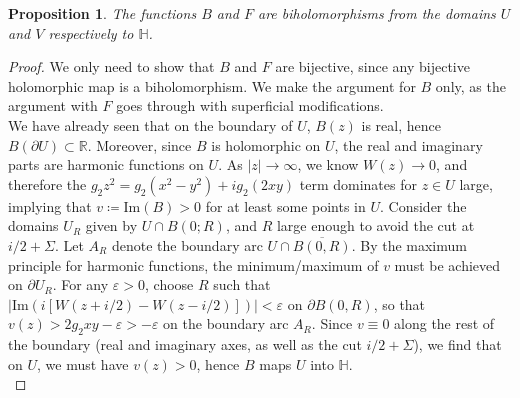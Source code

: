 \documentclass[10pt]{article}
\newcommand{\rr}{\mathbb{R}}
\newcommand{\hh}{\mathbb{H}}
\newcommand{\im}[1]{\text{Im}(#1)}
\theoremstyle{plain}
\newtheorem{prop}[theorem]{Proposition}
\theoremstyle{definition}
\theoremstyle{plain}
\begin{document}
\begin{prop}
	The functions $B$ and $F$ are biholomorphisms from the domains $U$ and $V$ respectively to $\hh$. 
\end{prop}

\begin{proof}
	We only need to show that $B$ and $F$ are bijective, since any bijective holomorphic map is a biholomorphism. We make the argument for $B$ only, as the argument with $F$ goes through with superficial modifications. \\
	
	We have already seen that on the boundary of $U$, $B(z)$ is real, hence $B(\partial U)\subset \rr$. Moreover, since $B$ is holomorphic on $U$, the real and imaginary parts are harmonic functions on $U$. As $|z|\to\infty$, we know $W(z)\to 0$, and therefore the $g_2z^2=g_2(x^2-y^2)+ig_2(2xy)$ term dominates for $z\in U$ large, implying that $v\coloneqq\im{B}>0$ for at least some points in $U$. Consider the domains $U_R$ given by $U\cap B(0;R)$, and $R$ large enough to avoid the cut at $i/2+\Sigma$. Let $A_R$ denote the boundary arc $U\cap\overline{B(0,R)}$. By the maximum principle for harmonic functions, the minimum/maximum of $v$ must be achieved on $\partial U_R$. For any $\varepsilon>0$, choose $R$ such that $|\text{Im}( i[W(z+i/2)-W(z-i/2)])|<\varepsilon$ on $\partial B(0,R)$, so that $v(z) > 2g_2xy - \varepsilon > - \varepsilon$ on the boundary arc $A_R$. Since $v\equiv 0$ along the rest of the boundary (real and imaginary axes, as well as the cut $i/2 + \Sigma$), we find that on $U$, we must have $v(z)>0$, hence $B$ maps $U$ into $\hh$.  \\
	

\end{proof}
\end{document}
